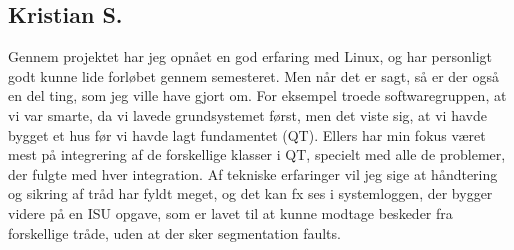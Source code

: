 \subsection{Kristian S.}

Gennem projektet har jeg opnået en god erfaring med Linux, og har personligt godt kunne lide forløbet gennem semesteret. Men når det er sagt, så er der også en del ting, som jeg ville have gjort om. For eksempel troede softwaregruppen, at vi var smarte, da vi lavede grundsystemet først, men det viste sig, at vi havde bygget et hus før vi havde lagt fundamentet (QT). Ellers har min fokus været mest på integrering af de forskellige klasser i QT, specielt med alle de problemer, der fulgte med hver integration. Af tekniske erfaringer vil jeg sige at håndtering og sikring af tråd har fyldt meget, og det kan fx ses i systemloggen, der bygger videre på en ISU opgave, som er lavet til at kunne modtage beskeder fra forskellige tråde, uden at der sker segmentation faults.